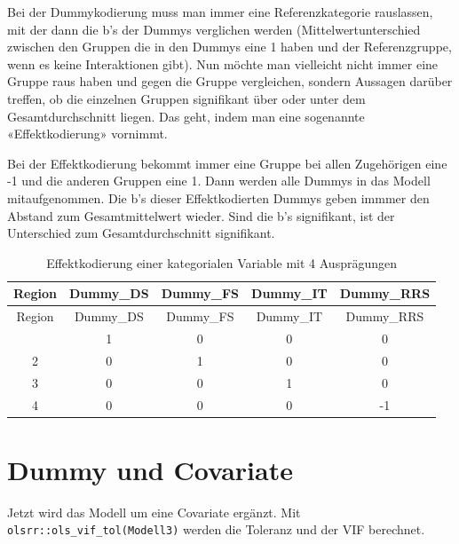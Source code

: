 \documentclass[
  10pt,
  letterpaper,
  a4paper, twoside]{scrreprt}
\begin{document}
\begin{tcolorbox}[enhanced jigsaw, coltitle=black, opacitybacktitle=0.6, toptitle=1mm, colbacktitle=quarto-callout-note-color!10!white, colback=white, toprule=.15mm, opacityback=0, bottomrule=.15mm, arc=.35mm, colframe=quarto-callout-note-color-frame, leftrule=.75mm, titlerule=0mm, breakable, left=2mm, rightrule=.15mm, title={IYI: Effektkodierung}, bottomtitle=1mm]

Bei der Dummykodierung muss man immer eine Referenzkategorie rauslassen,
mit der dann die b's der Dummys verglichen werden (Mittelwertunterschied
zwischen den Gruppen die in den Dummys eine 1 haben und der
Referenzgruppe, wenn es keine Interaktionen gibt). Nun möchte man
vielleicht nicht immer eine Gruppe raus haben und gegen die Gruppe
vergleichen, sondern Aussagen darüber treffen, ob die einzelnen Gruppen
signifikant über oder unter dem Gesamtdurchschnitt liegen. Das geht,
indem man eine sogenannte «Effektkodierung» vornimmt.

Bei der Effektkodierung bekommt immer eine Gruppe bei allen Zugehörigen
eine -1 und die anderen Gruppen eine 1. Dann werden alle Dummys in das
Modell mitaufgenommen. Die b's dieser Effektkodierten Dummys geben
immmer den Abstand zum Gesamtmittelwert wieder. Sind die b's
signifikant, ist der Unterschied zum Gesamtdurchschnitt signifikant.

\begin{longtable}[]{@{}ccccc@{}}
\caption{Effektkodierung einer kategorialen Variable mit 4
Ausprägungen}\tabularnewline
\toprule\noalign{}
Region & Dummy\_DS & Dummy\_FS & Dummy\_IT & Dummy\_RRS \\
\midrule\noalign{}
\endfirsthead
\toprule\noalign{}
Region & Dummy\_DS & Dummy\_FS & Dummy\_IT & Dummy\_RRS \\
\midrule\noalign{}
\endhead
\bottomrule\noalign{}
\endlastfoot
1 & 1 & 0 & 0 & 0 \\
2 & 0 & 1 & 0 & 0 \\
3 & 0 & 0 & 1 & 0 \\
4 & 0 & 0 & 0 & -1 \\
\end{longtable}

\end{tcolorbox}

\section{Dummy und Covariate}\label{dummy-und-covariate}

Jetzt wird das Modell um eine Covariate ergänzt. Mit
\texttt{olsrr::ols\_vif\_tol(Modell3)} werden die Toleranz und der VIF
berechnet.
\end{document}
